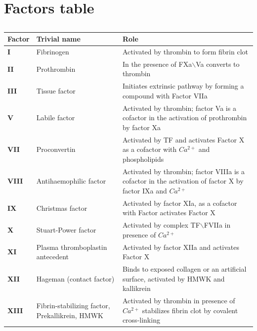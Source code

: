 \documentclass[%
 nofootinbib,
 amsmath,amssymb,
 aps,
 pra,
]{revtex4-1}
\begin{document}
\section{\label{sec:tabcoag}Factors table}
\begin{table}[h]
\begin{tabular}{p{2.8cm} p{5cm} p{8cm}}
\hline
\textbf{Factor} & \textbf{Trivial name} & \textbf{Role} \\
\hline
\textbf{I} & Fibrinogen & Activated by thrombin to form fibrin clot  \\ 
\hline
\textbf{II} & Prothrombin & In the presence of FXa$\backslash$Va converts to thrombin \\
\hline
\textbf{III} & Tissue factor & Initiates extrinsic pathway by forming a compound with Factor VIIa\\
\hline
\textbf{V} & Labile factor & Activated by thrombin; factor Va is a cofactor in the activation of prothrombin by factor Xa \\
\hline
\textbf{VII} & Proconvertin & Activated by TF and activates Factor X as a cofactor with $Ca^{2+}$ and phospholipids \\
\hline
\textbf{VIII} & Antihaemophilic factor & Activated by thrombin; factor VIIIa is a cofactor in the activation of factor X by factor IXa and $Ca^{2+}$ \\
\hline
\textbf{IX} & Christmas factor & Activated by factor XIa, as a cofactor with Factor activates Factor X  \\
\hline
\textbf{X} & Stuart-Power factor & Activated by complex TF$\backslash$FVIIa in presence of $Ca^{2+}$ \\
\hline
\textbf{XI} & Plasma thromboplastin antecedent & Activated by factor XIIa and activates Factor X \\
\hline
\textbf{XII} & Hageman (contact factor) & Binds to exposed collagen or an artificial surface, activated by HMWK and kallikrein\\
\hline
\textbf{XIII} & Fibrin-stabilizing factor, Prekallikrein, HMWK & Activated by thrombin in presence of $Ca^{2+}$ stabilizes fibrin clot by covalent cross-linking  \\
\hline
\end{tabular}
\caption{\label{Tab:coag_easytab}}
\end{table}
\pagebreak
\end{document}
